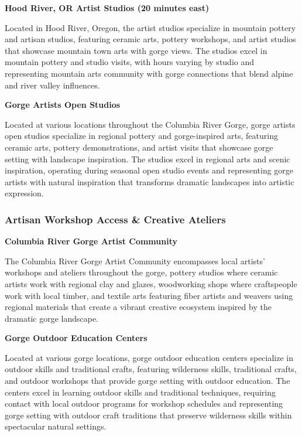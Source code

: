 \documentclass[
  11pt,
  letterpaper,
  DIV=10,
  numbers=noendperiod]{scrartcl}
\begin{document}
\textbf{Hood River, OR Artist Studios (20 minutes east)}

Located in Hood River, Oregon, the artist studios specialize in mountain
pottery and artisan studios, featuring ceramic arts, pottery workshops,
and artist studios that showcase mountain town arts with gorge views.
The studios excel in mountain pottery and studio visits, with hours
varying by studio and representing mountain arts community with gorge
connections that blend alpine and river valley influences.

\textbf{Gorge Artists Open Studios}

Located at various locations throughout the Columbia River Gorge, gorge
artists open studios specialize in regional pottery and gorge-inspired
arts, featuring ceramic arts, pottery demonstrations, and artist visits
that showcase gorge setting with landscape inspiration. The studios
excel in regional arts and scenic inspiration, operating during seasonal
open studio events and representing gorge artists with natural
inspiration that transforms dramatic landscapes into artistic
expression.

\subsubsection{Artisan Workshop Access \& Creative
Ateliers}\label{artisan-workshop-access-creative-ateliers-3}

\textbf{Columbia River Gorge Artist Community}

The Columbia River Gorge Artist Community encompasses local artists'
workshops and ateliers throughout the gorge, pottery studios where
ceramic artists work with regional clay and glazes, woodworking shops
where craftspeople work with local timber, and textile arts featuring
fiber artists and weavers using regional materials that create a vibrant
creative ecosystem inspired by the dramatic gorge landscape.

\textbf{Gorge Outdoor Education Centers}

Located at various gorge locations, gorge outdoor education centers
specialize in outdoor skills and traditional crafts, featuring
wilderness skills, traditional crafts, and outdoor workshops that
provide gorge setting with outdoor education. The centers excel in
learning outdoor skills and traditional techniques, requiring contact
with local outdoor programs for workshop schedules and representing
gorge setting with outdoor craft traditions that preserve wilderness
skills within spectacular natural settings.
\end{document}
